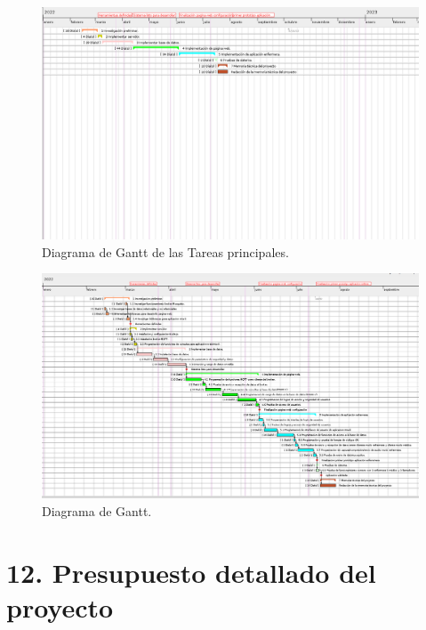 \documentclass[
11pt, %
]{charter}
\begin{document}
\begin{landscape}
\begin{figure}[htpb]
\centering 
\includegraphics[height=.85\textheight]{./Figuras/Tareas-reducida.png}
\caption{Diagrama de Gantt de las Tareas principales.}
\label{fig:diagGantt}
\end{figure}
\end{landscape}


\newpage
\begin{landscape}
\begin{figure}[htpb]
\centering 
\includegraphics[height=.85\textheight]{./Figuras/tareas.png}
\caption{Diagrama de Gantt.}
\label{fig:diagGantt2}
\end{figure}

\end{landscape}

\section{12. Presupuesto detallado del proyecto}
\label{sec:presupuesto}
\end{document}
